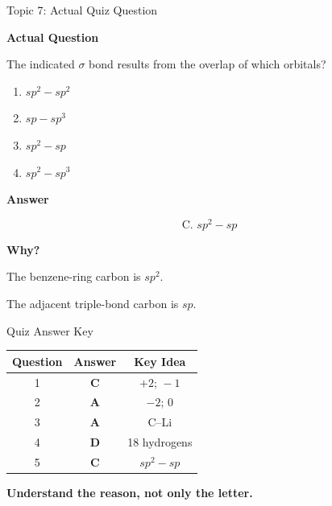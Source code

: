 \documentclass[aspectratio=169]{beamer}
\begin{document}
\begin{frame}[t]{Topic 7: Actual Quiz Question}
\scriptsize

\textbf{Actual Question}

The indicated $\sigma$ bond results from the overlap of which orbitals?

\vspace{0.08cm}

\begin{enumerate}
    \setlength{\itemsep}{0.04cm}
    \item[A.] $sp^2-sp^2$
    \item[B.] $sp-sp^3$
    \item[C.] $sp^2-sp$
    \item[D.] $sp^2-sp^3$
\end{enumerate}

\vspace{0.08cm}

\textbf{Answer}

\[
\boxed{\text{C. }sp^2-sp}
\]

\vspace{-0.12cm}

\textbf{Why?}

The benzene-ring carbon is $sp^2$.

The adjacent triple-bond carbon is $sp$.

\end{frame}

\begin{frame}[t]{Quiz Answer Key}
\small

\begin{center}
\renewcommand{\arraystretch}{1.35}
\begin{tabular}{ccc}
\toprule
\textbf{Question} & \textbf{Answer} & \textbf{Key Idea} \\
\midrule
1 & \textbf{C} & $+2;\,-1$ \\
2 & \textbf{A} & $-2;\,0$ \\
3 & \textbf{A} & C--Li \\
4 & \textbf{D} & 18 hydrogens \\
5 & \textbf{C} & $sp^2-sp$ \\
\bottomrule
\end{tabular}
\end{center}

\vspace{0.2cm}

\begin{center}
\textbf{Understand the reason, not only the letter.}
\end{center}

\end{frame}
\end{document}
